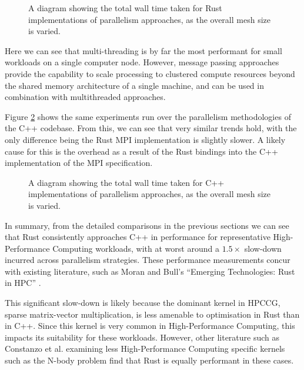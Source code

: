 \begin{figure}[H]
    \centering
    
    \caption{A diagram showing the total wall time taken for Rust implementations of parallelism approaches, as the overall mesh size is varied.}
    \label{fig:translation_parallelism_rust}
\end{figure}

Here we can see that multi-threading is by far the most performant for small workloads on a single computer node. However, message passing approaches provide the capability to scale processing to clustered compute resources beyond the shared memory architecture of a single machine, and can be used in combination with multithreaded approaches.

Figure \ref{fig:translation_parallelism_cpp} shows the same experiments run over the parallelism methodologies of the C++ codebase. From this, we can see that very similar trends hold, with the only difference being the Rust MPI implementation is slightly slower. A likely cause for this is the overhead as a result of the Rust bindings into the C++ implementation of the MPI specification.

\begin{figure}[H]
    \centering
    
    \caption{A diagram showing the total wall time taken for C++ implementations of parallelism approaches, as the overall mesh size is varied.}
    \label{fig:translation_parallelism_cpp}
\end{figure}

In summary, from the detailed comparisons in the previous sections we can see that Rust consistently approaches C++ in performance for representative High-Performance Computing workloads, with at worst around a $1.5 \times$ slow-down incurred across parallelism strategies. These performance measurements concur with existing literature, such as Moran and Bull's ``Emerging Technologies: Rust in HPC'' \cite{moranEmergingTechnologiesRust2023}.

This significant slow-down is likely because the dominant kernel in HPCCG, sparse matrix-vector multiplication, is less amenable to optimisation in Rust than in C++. Since this kernel is very common in High-Performance Computing, this impacts its suitability for these workloads. However, other literature such as Constanzo et al. \cite{costanzoPerformanceVsProgramming2021} examining less High-Performance Computing specific kernels such as the N-body problem find that Rust is equally performant in these cases.

